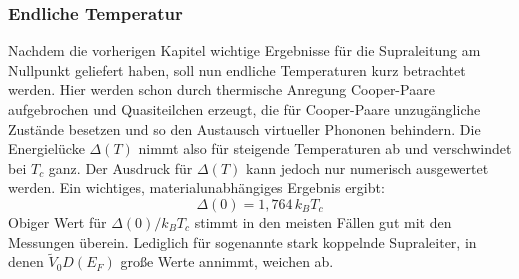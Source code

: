 		\subsubsection{Endliche Temperatur}
Nachdem die vorherigen Kapitel wichtige Ergebnisse für die Supraleitung am 
Nullpunkt geliefert haben, soll nun endliche Temperaturen kurz betrachtet werden.
Hier werden schon durch thermische Anregung Cooper-Paare aufgebrochen und 
Quasiteilchen erzeugt, die für Cooper-Paare unzugängliche Zustände besetzen und
so den Austausch virtueller Phononen behindern. Die Energielücke $\Delta(T)$ nimmt
also für steigende Temperaturen ab und verschwindet bei $T_c$ ganz. Der Ausdruck
für $\Delta(T)$ kann jedoch nur numerisch ausgewertet werden. Ein wichtiges, 
materialunabhängiges Ergebnis ergibt:
\[
	\Delta(0) = 1,764 \, k_B T_c
\]
Obiger Wert für $\Delta(0)/k_BT_c$ stimmt in den meisten Fällen gut mit den 
Messungen überein. Lediglich für sogenannte stark koppelnde Supraleiter, in denen
$\tilde{V}_0 D(E_F)$ große Werte annimmt, weichen ab. \cite{hunklinger}

